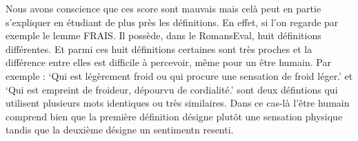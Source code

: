 Nous avons conscience que ces score sont mauvais mais celà peut en partie 
s'expliquer en étudiant de plus près les définitions. En effet, si l'on regarde 
par exemple le lemme FRAIS. Il possède, dans le RomansEval, huit définitions 
différentes. Et parmi ces huit définitions certaines sont très proches et la 
différence entre elles est difficile à percevoir, même pour un être humain. Par 
exemple : `Qui est légèrement froid ou qui procure une sensation de froid 
léger.' et `Qui est empreint de froideur, dépourvu de cordialité.' sont deux 
défintions qui utilisent plusieurs mots identiques ou très similaires. Dans ce 
cas-là l'être humain comprend bien que la première définition désigne plutôt 
une sensation physique tandis que la deuxième désigne un sentimentn resenti.
